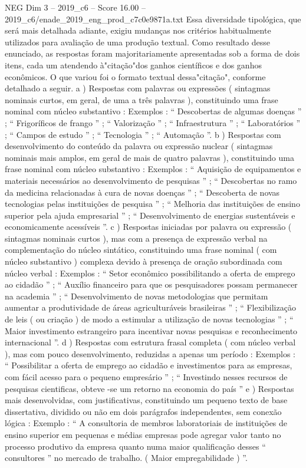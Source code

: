 \begin{textsample}{NEG Dim 3 – 2019\_c6 – Score 16.00 – 2019\_c6/enade\_2019\_eng\_prod\_c7c0e9871a.txt}
Essa diversidade tipológica, que será mais detalhada adiante, exigiu mudanças nos critérios habitualmente utilizados para avaliação de uma produção textual.
Como resultado desse enunciado, as respostas foram majoritariamente apresentadas sob a forma de dois itens, cada um atendendo à"citação"dos ganhos científicos e dos ganhos econômicos.
O que variou foi o formato textual dessa"citação", conforme detalhado a seguir. a ) Respostas com palavras ou expressões ( sintagmas nominais curtos, em geral, de uma a três palavras ), constituindo uma frase nominal com núcleo substantivo : Exemplos : “ Descobertas de algumas doenças ” ; “ Frigoríficos de frango ” ; “ Valorização ” ; “ Infraestrutura ” ; “ Laboratórios ” ; “ Campos de estudo ” ; “ Tecnologia ” ; “ Automação ”. b ) Respostas com desenvolvimento do conteúdo da palavra ou expressão nuclear ( sintagmas nominais mais amplos, em geral de mais de quatro palavras ), constituindo uma frase nominal com núcleo substantivo : Exemplos : “ Aquisição de equipamentos e materiais necessários ao desenvolvimento de pesquisas ” ; “ Descobertas no ramo da medicina relacionadas à cura de novas doenças ” ; “ Descoberta de novas tecnologias pelas instituições de pesquisa ” ; “ Melhoria das instituições de ensino superior pela ajuda empresarial ” ; “ Desenvolvimento de energias sustentáveis e economicamente acessíveis ”. c ) Respostas iniciadas por palavra ou expressão ( sintagmas nominais curtos ), mas com a presença de expressão verbal na complementação do núcleo sintático, constituindo uma frase nominal ( com núcleo substantivo ) complexa devido à presença de oração subordinada com núcleo verbal : Exemplos : “ Setor econômico possibilitando a oferta de emprego ao cidadão ” ; “ Auxílio financeiro para que os pesquisadores possam permanecer na academia ” ; “ Desenvolvimento de novas metodologias que permitam aumentar a produtividade de áreas agriculturáveis brasileiras ” ; “ Flexibilização de leis ( ou criação ) de modo a estimular a utilização de novas tecnologias ” ; “ Maior investimento estrangeiro para incentivar novas pesquisas e reconhecimento internacional ”. d ) Respostas com estrutura frasal completa ( com núcleo verbal ), mas com pouco desenvolvimento, reduzidas a apenas um período : Exemplos : “ Possibilitar a oferta de emprego ao cidadão e investimentos para as empresas, com fácil acesso para o pequeno empresário ” ; “ Investindo nesses recursos de pesquisas cientificas, obteve -se um retorno na economia do país ” e ) Respostas mais desenvolvidas, com justificativas, constituindo um pequeno texto de base dissertativa, dividido ou não em dois parágrafos independentes, sem conexão lógica : Exemplo : “ A consultoria de membros laboratoriais de instituições de ensino superior em pequenas e médias empresas pode agregar valor tanto no processo produtivo da empresa quanto numa maior qualificação desses “ consultores ” no mercado de trabalho. ( Maior empregabilidade ) ”.

\end{textsample}
